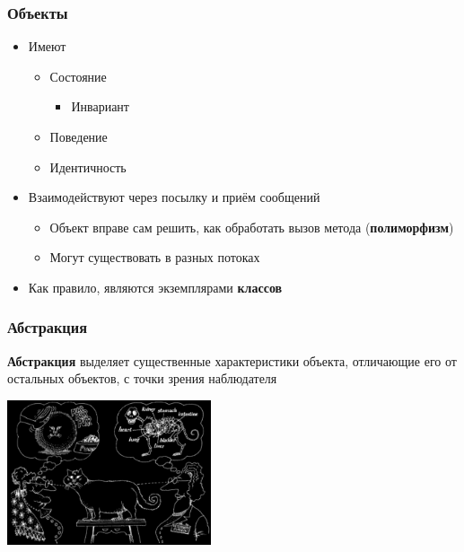 \documentclass{../cscslides}
\begin{document}
    \begin{frame}
        \frametitle{Объекты}
        \begin{itemize}
            \item Имеют
            \begin{itemize}
                \item Состояние
                \begin{itemize}
                    \item Инвариант
                \end{itemize}
                \item Поведение
                \item Идентичность
            \end{itemize}
            \item Взаимодействуют через посылку и приём сообщений
            \begin{itemize}
                \item Объект вправе сам решить, как обработать вызов метода (\textbf{полиморфизм})
                \item Могут существовать в разных потоках
            \end{itemize}
            \item Как правило, являются экземплярами \textbf{классов}
        \end{itemize}
    \end{frame}

    \begin{frame}
        \frametitle{Абстракция}
        \textbf{Абстракция} выделяет существенные характеристики объекта, отличающие его от остальных объектов, с точки зрения наблюдателя
        \vskip 1cm
        \begin{center}
            \includegraphics[width=0.45\textwidth]{abstractionBlack.png}
        \end{center}
    \end{frame}
\end{document}
